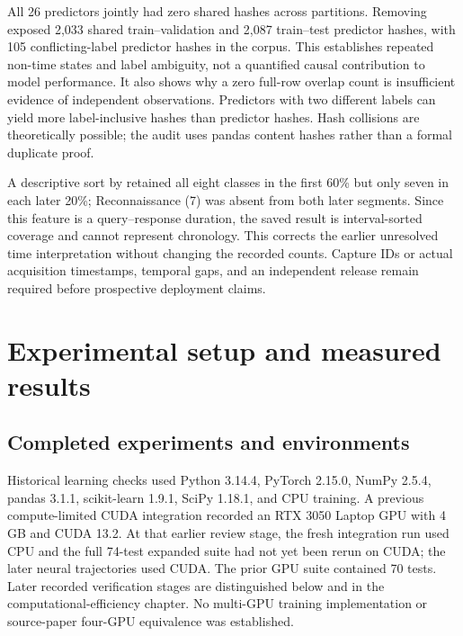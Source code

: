 \documentclass[11pt,a4paper]{report}
\begin{document}
\begin{table}[htbp]\centering
\caption{New content-overlap audit. Counts denote unique content hashes, not affected row counts. The last row is computed across the complete corpus.}\end{table}

All 26 predictors jointly had zero shared hashes across partitions. Removing  exposed 2,033 shared train--validation and 2,087 train--test predictor hashes, with 105 conflicting-label predictor hashes in the corpus. This establishes repeated non-time states and label ambiguity, not a quantified causal contribution to model performance. It also shows why a zero full-row overlap count is insufficient evidence of independent observations. Predictors with two different labels can yield more label-inclusive hashes than predictor hashes. Hash collisions are theoretically possible; the audit uses pandas content hashes rather than a formal duplicate proof.

A descriptive sort by  retained all eight classes in the first 60\% but only seven in each later 20\%; Reconnaissance (7) was absent from both later segments. Since this feature is a query--response duration, the saved result is interval-sorted coverage and cannot represent chronology. This corrects the earlier unresolved time interpretation without changing the recorded counts. Capture IDs or actual acquisition timestamps, temporal gaps, and an independent release remain required before prospective deployment claims.

\chapter{Experimental setup and measured results}
\section{Completed experiments and environments}
Historical learning checks used Python 3.14.4, PyTorch 2.15.0, NumPy 2.5.4, pandas 3.1.1, scikit-learn 1.9.1, SciPy 1.18.1, and CPU training. A previous compute-limited CUDA integration recorded an RTX 3050 Laptop GPU with 4 GB and CUDA 13.2. At that earlier review stage, the fresh integration run used CPU and the full 74-test expanded suite had not yet been rerun on CUDA; the later neural trajectories used CUDA. The prior GPU suite contained 70 tests. Later recorded verification stages are distinguished below and in the computational-efficiency chapter. No multi-GPU training implementation or source-paper four-GPU equivalence was established.
\end{document}
